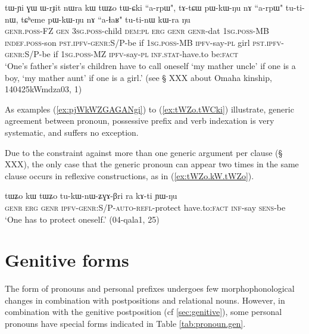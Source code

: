 \begin{exe}
\ex \label{ex:tWZo.tWCki}
\gll
tɯ-ɲi ɣɯ ɯ-rɟit nɯra kɯ tɯʑo tɯ-ɕki ``a-rpɯ", tɤ-tɕɯ pɯ-kɯ-ŋu nɤ ``a-rpɯ" tu-ti-nɯ, tɕʰeme pɯ-kɯ-ŋu nɤ ``a-ɬaʁ" tu-ti-nɯ kɯ-ra ŋu \\
\textsc{genr.poss}-FZ \textsc{gen} \textsc{3sg.poss}-child \textsc{dem:pl} \textsc{erg} \textsc{genr} \textsc{genr}-dat \textsc{1sg.poss}-MB \textsc{indef.poss}-son \textsc{pst.ipfv-genr}:S/P-be if \textsc{1sg.poss}-MB \textsc{ipfv}-say-\textsc{pl} girl \textsc{pst.ipfv-genr}:S/P-be  if \textsc{1sg.poss}-MZ \textsc{ipfv}-say-\textsc{pl} \textsc{inf.stat}-have.to be:\textsc{fact} \\
\glt `One's father's sister's children have to call oneself `my mather uncle' if one is a boy, `my mather aunt' if one is a girl.'  (see § XXX about Omaha kinship, 140425kWmdza03, 1)
\end{exe} 

As examples (\ref{ex:pjWkWZGAGANgi}) to (\ref{ex:tWZo.tWCki}) illustrate, generic agreement between pronoun, possessive prefix and verb indexation is very systematic, and suffers no exception.

Due to the constraint against more than one generic argument per clause (§ XXX), the only case that the generic pronoun can appear two times in the same clause occurs in reflexive constructions, as in (\ref{ex:tWZo.kW.tWZo}).

\begin{exe}
\ex \label{ex:tWZo.kW.tWZo}
\gll tɯʑo kɯ tɯʑo tu-kɯ-nɯ-ʑɣɤ-βri ra kɤ-ti ɲɯ-ŋu \\
\textsc{genr} \textsc{erg} \textsc{genr} \textsc{ipfv}-\textsc{genr}:S/P-\textsc{auto}-\textsc{refl}-protect have.to:\textsc{fact} \textsc{inf}-say \textsc{sens}-be \\
\glt `One has to protect oneself.' (04-qala1, 25)
\end{exe} 

\section{Genitive forms} \label{sec:pronouns.gen}
The form of pronouns and personal prefixes undergoes few morphophonological changes in combination with postpositions and relational nouns. However, in combination with the genitive postposition  (cf \ref{sec:genitive}), some  personal pronouns have special forms indicated in Table  \ref{tab:pronoun.gen}.

